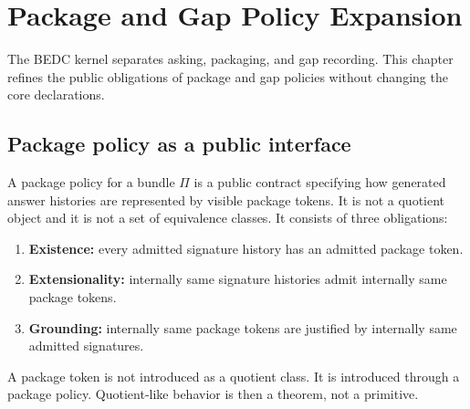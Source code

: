 \chapter{Package and Gap Policy Expansion}
\label{ch:hardening-package-gap-policy-expansion}

The BEDC kernel separates asking, packaging, and gap recording. This chapter refines the public obligations of package and gap policies without changing the core declarations.

\section{Package policy as a public interface}

\begin{definition}
\label{def:package-policy}
\label{def:package-policy-interface}
A package policy for a bundle \(\Pi\) is a public contract specifying how generated answer histories are represented by visible package tokens. It is not a quotient object and it is not a set of equivalence classes. It consists of three obligations:
\begin{enumerate}
  \item \textbf{Existence:} every admitted signature history has an admitted package token.
  \item \textbf{Extensionality:} internally same signature histories admit internally same package tokens.
  \item \textbf{Grounding:} internally same package tokens are justified by internally same admitted signatures.
\end{enumerate}
\end{definition}

\begin{principle}
\label{prin:no-quotient-shortcut}
A package token is not introduced as a quotient class. It is introduced through a package policy. Quotient-like behavior is then a theorem, not a primitive.
\end{principle}

